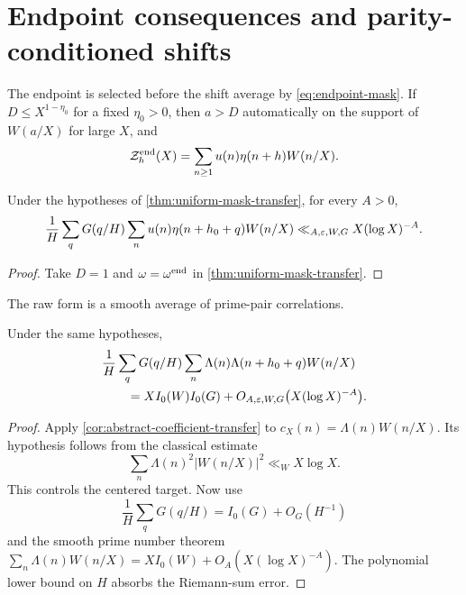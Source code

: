 \section{Endpoint consequences and parity-conditioned shifts}
\label{sec:endpoint-even}

The endpoint is selected before the shift average by
\eqref{eq:endpoint-mask}.  If $D\leq X^{1-\eta_0}$ for a fixed
$\eta_0>0$, then $a>D$ automatically on the support of $W(a/X)$ for
large $X$, and
\begin{equation}
 \mathcal Z_h^{\rm end}(X)=
 \sum_{n\geq1}u(n)\eta(n+h)W(n/X).
 \label{eq:endpoint-centered-correlation}
\end{equation}

\begin{corollary}
\label{cor:endpoint-centered-mean}
Under the hypotheses of \cref{thm:uniform-mask-transfer}, for every
$A>0$,
\begin{equation}
 \frac1H\sum_qG(q/H)
 \sum_n u(n)\eta(n+h_0+q)W(n/X)
 \ll_{A,\varepsilon,W,G}X(\log X)^{-A}.
 \label{eq:endpoint-centered-mean}
\end{equation}
\end{corollary}

\begin{proof}
Take $D=1$ and $\omega=\omega^{\rm end}$ in
\cref{thm:uniform-mask-transfer}.
\end{proof}

The raw form is a smooth average of prime-pair correlations.

\begin{corollary}
\label{cor:raw-endpoint-mean}
Under the same hypotheses,
\begin{align}
 &\frac1H\sum_qG(q/H)
 \sum_n\Lambda(n)\Lambda(n+h_0+q)W(n/X)
 \notag\\
 &\qquad={}
 XI_0(W)I_0(G)+O_{A,\varepsilon,W,G}
 \bigl(X(\log X)^{-A}\bigr).
 \label{eq:raw-endpoint-mean}
\end{align}
\end{corollary}

\begin{proof}
Apply \cref{cor:abstract-coefficient-transfer} to
$c_X(n)=\Lambda(n)W(n/X)$.  Its hypothesis follows from the classical
estimate
\[
 \sum_n\Lambda(n)^2|W(n/X)|^2\ll_WX\log X.
\]
This controls the centered target.  Now use
\[
 \frac1H\sum_qG(q/H)=I_0(G)+O_G(H^{-1})
\]
and the smooth prime number theorem
$\sum_n\Lambda(n)W(n/X)=XI_0(W)+O_A(X(\log X)^{-A})$.
The polynomial lower bound on $H$ absorbs the Riemann-sum error.
\end{proof}

